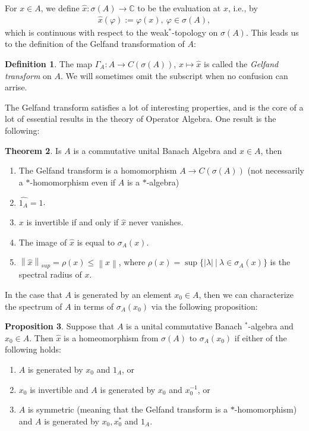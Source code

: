 \documentclass[10pt,twoside,openany,final]{memoir}
\theoremstyle{definition}
\newtheorem{theorem}{Theorem}[chapter]
\newtheorem{proposition}[theorem]{Proposition}
\newtheorem{definition}[theorem]{Definition}
\theoremstyle{Break}
\newcommand{\lv}{\left\lVert}
\newcommand{\rv}{\right\rVert}
\newcommand{\C}{\mathbb{C}}
\begin{document}
For $x \in A$, we define $\hat{x} \colon \sigma(A) \to \C$ to be the evaluation at $x$, i.e., by
\begin{align*}
	\hat{x}(\varphi):=\varphi(x), \ \varphi \in \sigma(A),
\end{align*}
which is continuous with respect to the weak$^*$-topology on $\sigma(A)$. This leads us to the definition of the Gelfand transformation of $A$:
\begin{definition}
	The map $\Gamma_A \colon A \to C(\sigma(A))$, $x \mapsto \hat{x}$ is called the \emph{Gelfand transform} on $A$. We will sometimes omit the subscript when no confusion can arrise.
\end{definition}
The Gelfand transform satisfies a lot of interesting properties, and is the core of a lot of essential results in the theory of Operator Algebra. One result is the following:
\begin{theorem}
	Is $A$ is a commutative unital Banach Algebra and $x \in A$, then
	\begin{enumerate}
		\item The Gelfand transform is a homomorphism $A \to C(\sigma(A))$ (not necessarily a $*$-homomorphism even if $A$ is a $*$-algebra)
		\item $\hat{1_A}=1$.
		\item $x$ is invertible if and only if $\hat{x}$ never vanishes.
		\item The image of $\hat{x}$ is equal to $\sigma_A(x)$.
		\item $\lv \hat{x}\rv_{sup}= \rho(x)\leq \lv x \rv$, where $\rho(x)=\sup\{|\lambda| \ \big| \ \lambda \in \sigma_A(x)\}$ is the spectral radius of $x$.
	\end{enumerate}
	\label{1.13}
\end{theorem}
In the case that $A$ is generated by an element $x_0 \in A$, then we can characterize the spectrum of $A$ in terms of $\sigma_A(x_0)$ via the following proposition:
\begin{proposition}
	Suppose that $A$ is a unital commutative Banach $^*$-algebra and $x_0 \in A$. Then $\hat{x}$ is a homeomorphism from $\sigma(A)$ to $\sigma_A(x_0)$ if either of the following holds:
	\begin{enumerate}
		\item $A$ is generated by $x_0$ and $1_A$, or
		\item $x_0$ is invertible and $A$ is generated by $x_0$ and $x_0^{-1}$, or
		\item $A$ is symmetric (meaning that the Gelfand transform is a $*$-homomorphism) and $A$ is generated by $x_0,x_0^*$ and $1_A$.
	\end{enumerate}
\end{proposition}
\end{document}
